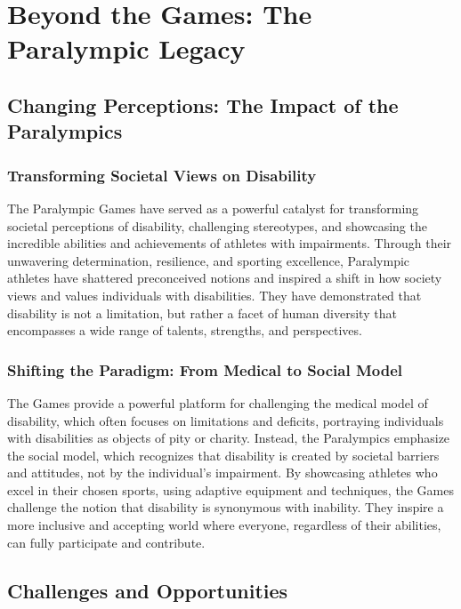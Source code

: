 \chapter{Beyond the Games: The Paralympic Legacy}

\section{Changing Perceptions: The Impact of the Paralympics}

\subsection{Transforming Societal Views on Disability}
The Paralympic Games have served as a powerful catalyst for transforming societal perceptions of disability, challenging stereotypes, and showcasing the incredible abilities and achievements of athletes with impairments. Through their unwavering determination, resilience, and sporting excellence, Paralympic athletes have shattered preconceived notions and inspired a shift in how society views and values individuals with disabilities. They have demonstrated that disability is not a limitation, but rather a facet of human diversity that encompasses a wide range of talents, strengths, and perspectives.

\subsection{Shifting the Paradigm: From Medical to Social Model}

The Games provide a powerful platform for challenging the medical model of disability, which often focuses on limitations and deficits, portraying individuals with disabilities as objects of pity or charity. Instead, the Paralympics emphasize the social model, which recognizes that disability is created by societal barriers and attitudes, not by the individual's impairment. By showcasing athletes who excel in their chosen sports, using adaptive equipment and techniques, the Games challenge the notion that disability is synonymous with inability. They inspire a more inclusive and accepting world where everyone, regardless of their abilities, can fully participate and contribute.

\section{Challenges and Opportunities}

